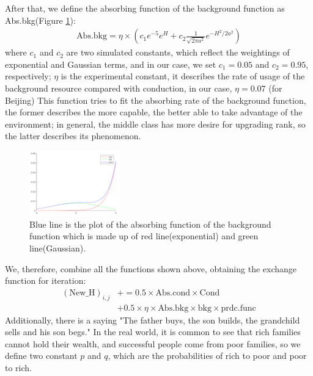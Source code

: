 \documentclass[10pt]{article}
\begin{document}
\begin{multicols}{2}
        After that, we define the absorbing function of the background function as Abs.bkg(Figure \ref{abs.bkg}):
        \begin{align*}
            \text{Abs.bkg} = \eta \times (c_{1} e^{-5} e^{H} + c_{2} \frac{1}{\sqrt{2 \pi a^2}}  e^{-H^2 / 2 a^2})             
        \end{align*}
        where $c_{1}$ and $c_{2}$ are two simulated constants, which reflect the weightings of exponential and Gaussian terms, and in our case, we set $c_{1} = 0.05$ and $c_{2} = 0.95$, respectively; $\eta$ is the experimental constant, it describes the rate of usage of the background resource compared with conduction, in our case, $\eta = 0.07$ (for Beijing) This function tries to fit the absorbing rate of the background function, the former describes the more capable, the better able to take advantage of the environment; in general, the middle class has more desire for upgrading rank, so the latter describes its phenomenon.
    
        \begin{figure}[H]
            \centering 
            \includegraphics[width = 0.35\textwidth]{abs.bkg.PNG}
            \caption{Blue line is the plot of the absorbing function of the background function which is made up of red line(exponential) and green line(Gaussian).}
            \label{abs.bkg}
        \end{figure}

        We, therefore, combine all the functions shown above, obtaining the exchange function for iteration:
        \begin{align*}
            (\text{New\_H})_{i,j} & += 0.5 \times \text{Abs.cond} \times \text{Cond}\\
                                  & +  0.5 \times \eta \times \text{Abs.bkg} \times \text{bkg} \times \text{prdc.func}
        \end{align*}
        Additionally, there is a saying "The father buys, the son builds, the grandchild sells and his son begs." In the real world, it is common to see that rich families cannot hold their wealth, and successful people come from poor families, so we define two constant $p$ and $q$, which are the probabilities of rich to poor and poor to rich.


\end{multicols}
\end{document}
